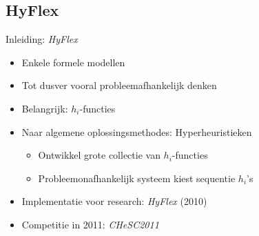 \documentclass{beamer}
\begin{document}
\subsection{HyFlex}
\begin{frame}{Inleiding: \emph{HyFlex}}
\begin{itemize}[<+->]
 \item Enkele formele modellen
 \item Tot dusver vooral probleemafhankelijk denken
 \item Belangrijk: $h_i$-functies
 \item Naar algemene oplossingsmethodes: Hyperheuristieken
 \begin{itemize}
   \item Ontwikkel grote collectie van $h_i$-functies
   \item Probleemonafhankelijk systeem kiest sequentie $h_i$'s
 \end{itemize}
 \item Implementatie voor research: \emph{HyFlex} (2010)
 \item Competitie in 2011: \emph{CHeSC2011}
\end{itemize}
\end{frame}
\end{document}
